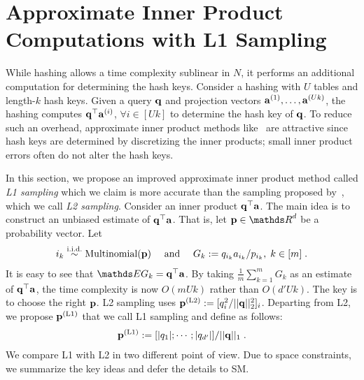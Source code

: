 \vspace{-4pt}
\section{Approximate Inner Product Computations with L1 Sampling}
\label{sec:iprod}
\vspace{-4pt}

While hashing allows a time complexity sublinear in $N$, it performs an additional computation for determining the hash keys.
Consider a hashing with $U$ tables and length-$k$ hash keys. 
Given a query ${{\mathbf q}}$ and projection vectors $\mathbf{a}^{(1)}, \ldots, \mathbf{a}^{(Uk)}$, the hashing computes ${{\mathbf q}}^{\top} \mathbf{a}^{(i)}$, $\forall i \in [Uk]$ to determine the hash key of ${{\mathbf q}}$. 
To reduce such an overhead, approximate inner product methods like~\cite{jain10hashing,kannan09spectral} are attractive since hash keys are determined by discretizing the inner products; small inner product errors often do not alter the hash keys. 

In this section, we propose an improved approximate inner product method called \emph{L1 sampling} which we claim is more accurate than the sampling proposed by~\citet{jain10hashing}, which we call \emph{L2 sampling}.
Consider an inner product ${{\mathbf q}}^{\top} \mathbf{a}$.
The main idea is to construct an unbiased estimate of ${{\mathbf q}}^{\top} \mathbf{a}$.
That is, let $\p \in \dsR^d$ be a probability vector.
Let
\begin{equation}\begin{aligned} \label{eq:def_iprod} 
  i_k \stackrel{\text{i.i.d.}}{\sim} \text{Multinomial}({{\mathbf p}}) \quad \text{ and } \quad
  G_k := q_{i_k} a_{i_k} / p_{i_k}, \; k \in [m]  \;.
\end{aligned}\end{equation}
It is easy to see that $\expt G_k = \q^\T \a$.
By taking $\tfrac{1}{m}\sum_{k=1}^m G_k$ as an estimate of ${{\mathbf q}}^{\top}\mathbf{a}$, the time complexity is now $O(mUk)$ rather than $O(d'Uk)$.
The key is to choose the right ${{\mathbf p}}$.
L2 sampling uses ${{\mathbf p}}^{(\mathbf{\text{L}}2)} := [q_i^2 / ||{{\mathbf q}}||_2^2]_i$.
Departing from L2, we propose ${{\mathbf p}}^{(\mathbf{\text{L}}1)}$ that we call L1 sampling and define as follows:
\begin{align}
  {{\mathbf p}}^{(\mathbf{\text{L}}1)} := [|q_1|;\cdots;|q_{d'}|] / || {{\mathbf q}} ||_1 \;.
\end{align}
%
We compare L1 with L2 in two different point of view.
Due to space constraints, we summarize the key ideas and defer the details to SM.

